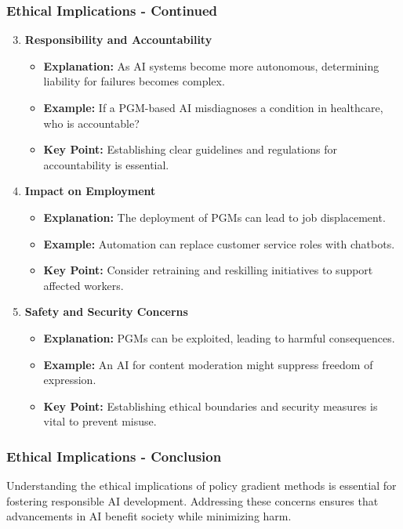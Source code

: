 \documentclass[aspectratio=169]{beamer}
\begin{document}
\begin{frame}[fragile]
    \frametitle{Ethical Implications - Continued}
    \begin{enumerate}
        \setcounter{enumi}{2} %
        \item \textbf{Responsibility and Accountability}
            \begin{itemize}
                \item \textbf{Explanation:} As AI systems become more autonomous, determining liability for failures becomes complex.
                \item \textbf{Example:} If a PGM-based AI misdiagnoses a condition in healthcare, who is accountable?
                \item \textbf{Key Point:} Establishing clear guidelines and regulations for accountability is essential.
            \end{itemize}

        \item \textbf{Impact on Employment}
            \begin{itemize}
                \item \textbf{Explanation:} The deployment of PGMs can lead to job displacement.
                \item \textbf{Example:} Automation can replace customer service roles with chatbots.
                \item \textbf{Key Point:} Consider retraining and reskilling initiatives to support affected workers.
            \end{itemize}

        \item \textbf{Safety and Security Concerns}
            \begin{itemize}
                \item \textbf{Explanation:} PGMs can be exploited, leading to harmful consequences.
                \item \textbf{Example:} An AI for content moderation might suppress freedom of expression.
                \item \textbf{Key Point:} Establishing ethical boundaries and security measures is vital to prevent misuse.
            \end{itemize}
    \end{enumerate}
\end{frame}

\begin{frame}[fragile]
    \frametitle{Ethical Implications - Conclusion}
    Understanding the ethical implications of policy gradient methods is essential for fostering responsible AI development. Addressing these concerns ensures that advancements in AI benefit society while minimizing harm.
\end{frame}
\end{document}
